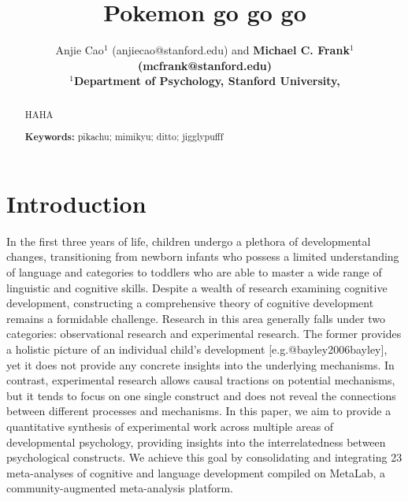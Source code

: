 \documentclass[10pt, letterpaper]{article}
\title{Pokemon go go go}
\author{Anjie Cao$^1$  (anjiecao@stanford.edu)
 and \bf{Michael C. Frank$^1$ (mcfrank@stanford.edu)} \\
$^1$Department of Psychology, Stanford University, }
\begin{document}
\maketitle

\begin{abstract}
HAHA

\textbf{Keywords:}
pikachu; mimikyu; ditto; jigglypufff
\end{abstract}

\hypertarget{introduction}{%
\section{Introduction}\label{introduction}}

In the first three years of life, children undergo a plethora of
developmental changes, transitioning from newborn infants who possess a
limited understanding of language and categories to toddlers who are
able to master a wide range of linguistic and cognitive skills. Despite
a wealth of research examining cognitive development, constructing a
comprehensive theory of cognitive development remains a formidable
challenge. Research in this area generally falls under two categories:
observational research and experimental research. The former provides a
holistic picture of an individual child's development
{[}e.g.@bayley2006bayley{]}, yet it does not provide any concrete
insights into the underlying mechanisms. In contrast, experimental
research allows causal tractions on potential mechanisms, but it tends
to focus on one single construct and does not reveal the connections
between different processes and mechanisms. In this paper, we aim to
provide a quantitative synthesis of experimental work across multiple
areas of developmental psychology, providing insights into the
interrelatedness between psychological constructs. We achieve this goal
by consolidating and integrating 23 meta-analyses of cognitive and
language development compiled on MetaLab, a community-augmented
meta-analysis platform.
\end{document}
